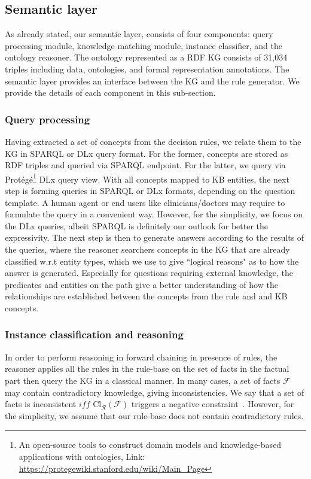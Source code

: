 \subsection{Semantic layer}
As already stated, our semantic layer, consists of four components: query processing module, knowledge matching module, instance classifier, and the ontology reasoner. The ontology represented as a RDF KG consists of 31,034 triples including data, ontologies, and formal representation annotations. The semantic layer provides an interface between the KG and the rule generator. We provide the details of each component in this sub-section.

\subsubsection{Query processing}
Having extracted a set of concepts from the decision rules, we relate them to the KG in SPARQL or DLx query format. For the former, concepts are stored as RDF triples and queried via SPARQL endpoint. For the latter, we query via Prot{\'e}g{\'e}\footnote{An open-source tools to construct domain models and knowledge-based applications with ontologies, Link: \url{https://protegewiki.stanford.edu/wiki/Main_Page}} DLx query view. 
With all concepts mapped to KB entities, the next step is forming queries in SPARQL or DLx formats, depending on the question template. 
A human agent or end users like clinicians/doctors may require to formulate the query in a convenient way. However, for the simplicity, we focus on the DLx queries, albeit SPARQL is definitely our outlook for better the expressivity. The next step is then to generate answers according to the results of the queries, where the reasoner searchers concepts in the KG that are already classified w.r.t entity types, which we use to give ``logical reasons" as to how the answer is generated. Especially for questions requiring external knowledge, the predicates and entities on the path give a better understanding of how the relationships are established between the concepts from the rule and and KB concepts. 

\subsubsection{Instance classification and reasoning}
In order to perform reasoning in forward chaining in presence of rules, the reasoner applies all the rules in the rule-base on the set of facts in the factual part then query the KG in a classical manner.
In many cases, a set of facts $\mathcal{F}$ may contain contradictory knowledge, giving inconsistencies. We say that a set of facts is inconsistent $iff$  $\mathrm{Cl}_{\mathcal{R}}(\mathcal{F})$ triggers a negative constraint~\cite{garoufallou2016metadata}. However, for the simplicity, we assume that our rule-base does not contain contradictory rules. 

